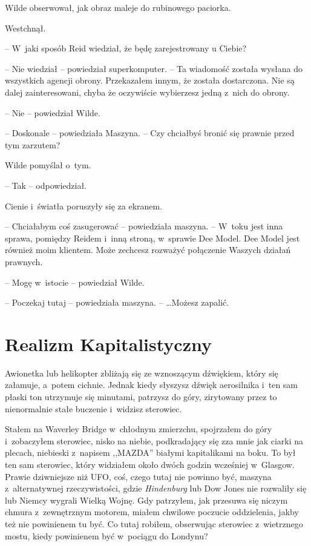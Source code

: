 \documentclass[oneside,polish,11pt,sfheadings]{mwbk}
\begin{document}
Wilde obserwował, jak obraz maleje do rubinowego paciorka.

Westchnął. 

-- W~jaki sposób Reid wiedział, że będę zarejestrowany u
Ciebie?

-- Nie wiedział -- powiedział superkomputer. -- Ta wiadomość została
wysłana do wszystkich agencji obrony. Przekazałem innym, że została
dostarczona. Nie są dalej zainteresowani, chyba że oczywiście wybierzesz
jedną z~nich do obrony.

-- Nie -- powiedział Wilde.

-- Doskonale -- powiedziała Maszyna. -- Czy chciałbyś bronić się prawnie
przed tym zarzutem?

Wilde pomyślał o~tym.

-- Tak -- odpowiedział.

Cienie i~światła poruszyły się za ekranem.

-- Chciałabym coś zasugerować -- powiedziała maszyna. -- W~toku jest inna
sprawa, pomiędzy Reidem i~inną stroną, w~sprawie Dee Model. Dee Model
jest również moim klientem. Może zechcesz rozważyć połączenie Waszych
działań prawnych.

-- Mogę w~istocie -- powiedział Wilde.

-- Poczekaj tutaj -- powiedziała maszyna. -- \ldots Możesz zapalić.

\chapter{Realizm Kapitalistyczny}

Awionetka lub helikopter zbliżają się ze wznoszącym dźwiękiem, który się
załamuje, a~potem cichnie. Jednak kiedy słyszysz dźwięk aerosilnika i~ten sam płaski ton utrzymuje się minutami, patrzysz do góry, zirytowany
przez to nienormalnie stałe buczenie i~widzisz sterowiec.

Stałem na Waverley Bridge w~chłodnym zmierzchu, spojrzałem do góry i~zobaczyłem sterowiec, nisko na niebie, podkradający się zza mnie jak
ciarki na plecach, niebieski z~napisem ,,MAZDA'' białymi kapitalikami na
boku. To był ten sam sterowiec, który widziałem około dwóch godzin
wcześniej w~Glasgow. Prawie dziwniejsze niż UFO, coś, czego tutaj nie
powinno być, maszyna z~alternatywnej rzeczywistości, gdzie
\emph{Hindenburg} lub Dow Jones nie rozwaliły się lub Niemcy wygrali
Wielką Wojnę. Gdy patrzyłem, jak przesuwa się niczym chmura z~zewnętrznym motorem, miałem chwilowe poczucie oddzielenia, jakby też nie
powinienem tu być. Co tutaj robiłem, obserwując sterowiec z~wietrznego
mostu, kiedy powinienem być w~pociągu do Londynu?
\end{document}
